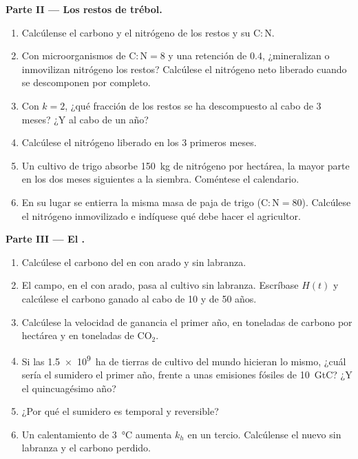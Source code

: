 \begin{problem}
\medskip
\noindent\textbf{Parte II --- Los restos de trébol.}
\begin{enumerate}[resume]
  \item Calcúlense el carbono y el nitrógeno de los restos y su
        $\mathrm{C:N}$.
  \item Con microorganismos de $\mathrm{C:N} = 8$ y una retención de $0.4$,
        ¿mineralizan o inmovilizan nitrógeno los restos? Calcúlese el
        nitrógeno neto liberado cuando se descomponen por completo.
  \item Con $k = 2$, ¿qué fracción de los restos se ha descompuesto al cabo
        de 3 meses? ¿Y al cabo de un año?
  \item Calcúlese el nitrógeno liberado en los 3 primeros meses.
  \item Un cultivo de trigo absorbe \qty{150}{kg} de nitrógeno por
        hectárea, la mayor parte en los dos meses siguientes a la siembra.
        Coméntese el calendario.
  \item En su lugar se entierra la misma masa de paja de trigo
        ($\mathrm{C:N} = 80$). Calcúlese el nitrógeno inmovilizado e
        indíquese qué debe hacer el agricultor.
\end{enumerate}

\medskip
\noindent\textbf{Parte III --- El .}
\begin{enumerate}[resume]
  \item Calcúlese el carbono del  en  con arado y
        sin labranza.
  \item El campo, en el  con arado, pasa al cultivo sin
        labranza. Escríbase $H(t)$ y calcúlese el carbono ganado al cabo de
        10 y de 50 años.
  \item Calcúlese la velocidad de ganancia el primer año, en toneladas de
        carbono por hectárea y en toneladas de $\mathrm{CO_2}$.
  \item Si las \qty{1.5e9}{ha} de tierras de cultivo del mundo hicieran lo
        mismo, ¿cuál sería el sumidero el primer año, frente a unas
        emisiones fósiles de \qty{10}{GtC}? ¿Y el quincuagésimo año?
  \item ¿Por qué el sumidero es temporal y reversible?
  \item Un calentamiento de \qty{3}{\celsius} aumenta $k_h$ en un tercio.
        Calcúlense el nuevo  sin labranza y el carbono
        perdido.
\end{enumerate}


\end{problem}
